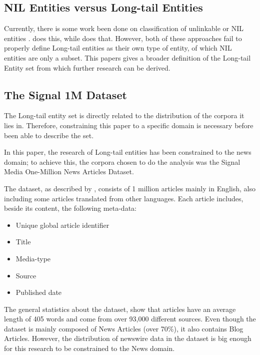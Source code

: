 \subsection{NIL Entities versus Long-tail Entities}
Currently, there is some work been done on classification of unlinkable or NIL entities \cite{someone}.
\cite{someone} does this, while \cite{someone} does that.
However, both of these approaches fail to properly define Long-tail entities as their own type of entity, of which NIL entities are only a subset.
This papers gives a broader definition of the Long-tail Entity set from which further research can be derived. 

\subsection{The Signal 1M Dataset}
The Long-tail entity set is directly related to the distribution of the corpora it lies in.
Therefore, constraining this paper to a specific domain is necessary before been able to describe the set.

In this paper, the research of Long-tail entities has been constrained to the news domain;
to achieve this, the corpora chosen to do the analysis was the Signal Media One-Million News Articles Dataset\cite{Signal1M2016}.

The dataset, as described by \cite{Signal1M2016}, consists of 1 million articles mainly in English,
also including some articles translated from other languages.
Each article includes, beside its content, the following meta-data:
\begin{itemize}
  \item Unique global article identifier
  \item Title
  \item Media-type
  \item Source
  \item Published date
\end{itemize}

The general statistics about the dataset, show that articles have an average length of 405 words and come from over 93,000 different sources.
Even though the dataset is mainly composed of News Articles (over 70\%), it also contains Blog Articles\cite{Signal1M2016}.
However, the distribution of newswire data in the dataset is big enough for this research to be constrained to the News domain.
